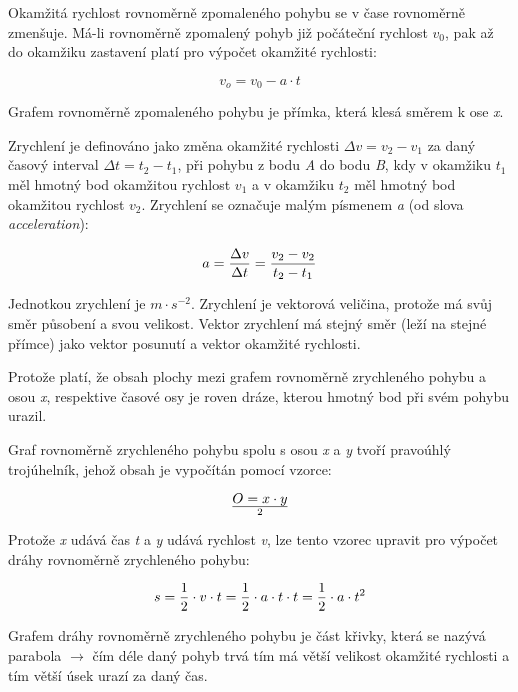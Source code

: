 Okamžitá rychlost rovnoměrně zpomaleného pohybu se v čase rovnoměrně zmenšuje. Má-li rovnoměrně zpomalený pohyb již počáteční rychlost $v_0$, pak až do okamžiku zastavení platí pro výpočet okamžité rychlosti:

$$ v_o = v_0 - a\cdot t $$

Grafem rovnoměrně zpomaleného pohybu je přímka, která klesá směrem k ose {\it x}.

\vskip 4mm
\centerline{}
\vskip 4mm


Zrychlení je definováno jako změna okamžité rychlosti $\Delta v = v_2 - v_1$ za daný časový interval $\Delta t = t_2 - t_1$, při pohybu z bodu {\it A} do bodu {\it B}, kdy v okamžiku $t_1$ měl hmotný bod okamžitou rychlost $v_1$ a v okamžiku $t_2$ měl hmotný bod okamžitou rychlost $v_2$. Zrychlení se označuje malým písmenem {\it a} (od slova {\it acceleration}):

$$a = {\Delta v \over \Delta t }  = {{v_2 - v_2} \over {t_2 - t_1}}$$

Jednotkou zrychlení je $m\cdot s^{-2} $. Zrychlení je vektorová veličina, protože má svůj směr působení a svou velikost. Vektor zrychlení má stejný směr (leží na stejné přímce) jako vektor posunutí a vektor okamžité rychlosti. 



Protože platí, že obsah plochy mezi grafem rovnoměrně zrychleného pohybu  a osou {\it x}, respektive časové osy je roven dráze, kterou hmotný bod při svém pohybu urazil. 

\vskip 4mm
\centerline{}
\vskip 4mm

Graf rovnoměrně zrychleného pohybu spolu s osou {\it x} a {\it y} tvoří pravoúhlý trojúhelník, jehož obsah je vypočítán pomocí vzorce:

$$ O = {x\cdot y} \over 2 $$ 

Protože {\it x} udává čas {\it t} a {\it y} udává rychlost {\it v}, lze tento vzorec upravit pro výpočet dráhy rovnoměrně zrychleného pohybu:

$$ s = {1 \over 2} \cdot v \cdot t = {1 \over 2} \cdot a \cdot t \cdot t = {1 \over 2} \cdot a \cdot t^2 $$


Grafem dráhy rovnoměrně zrychleného pohybu je část křivky, která se nazývá parabola $\rightarrow$ čím déle daný pohyb trvá tím má větší velikost okamžité rychlosti a tím větší úsek urazí za daný čas.

